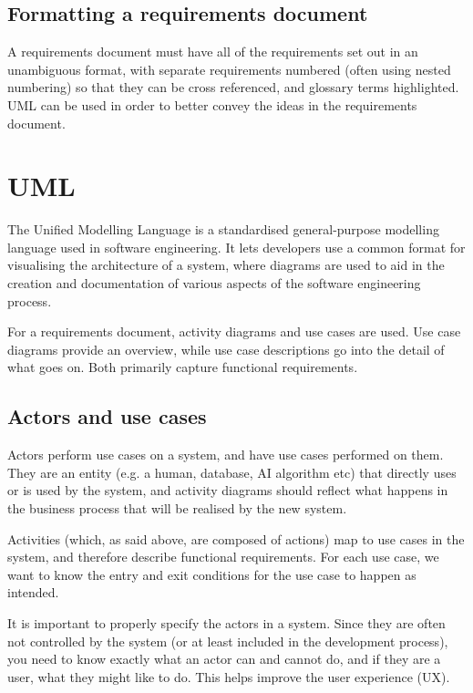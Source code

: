 \subsection{Formatting a requirements document}

A requirements document must have all of the requirements set out in an
unambiguous format, with separate requirements numbered (often using nested
numbering) so that they can be cross referenced, and glossary terms
highlighted. UML can be used in order to better convey the ideas in the
requirements document.

\section{UML}

The Unified Modelling Language is a standardised general-purpose modelling
language used in software engineering. It lets developers use a common format
for visualising the architecture of a system, where diagrams are used to aid in
the creation and documentation of various aspects of the software engineering
process.

For a requirements document, activity diagrams and use cases are used. Use case
diagrams provide an overview, while use case descriptions go into the detail of
what goes on. Both primarily capture functional requirements.

\subsection{Actors and use cases}

Actors perform use cases on a system, and have use cases performed on them. They
are an entity (e.g. a human, database, AI algorithm etc) that directly uses or
is used by the system, and activity diagrams should reflect what happens in the
business process that will be realised by the new system.

Activities (which, as said above, are composed of actions) map to use cases in
the system, and therefore describe functional requirements. For each use case,
we want to know the entry and exit conditions for the use case to happen as
intended.

It is important to properly specify the actors in a system. Since they are often
not controlled by the system (or at least included in the development process),
you need to know exactly what an actor can and cannot do, and if they are a
user, what they might like to do. This helps improve the user experience (UX).

